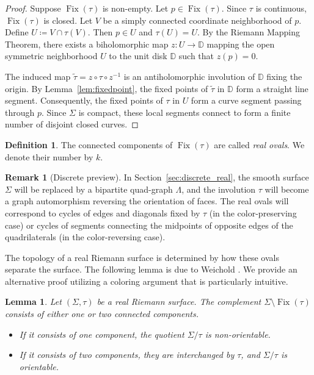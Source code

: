 \documentclass[11pt,a4paper]{article}
\newtheorem{lemma}[theorem]{Lemma}
\theoremstyle{definition}
\newtheorem*{definition}{Definition}
\newtheorem*{remark}{Remark}
\DeclareMathOperator{\fix}{\mathrm{Fix}}
\begin{document}
\begin{proof}
	Suppose $\fix(\tau)$ is non-empty. Let $p \in \fix(\tau)$. Since $\tau$ is continuous, $\fix(\tau)$ is closed. 
	Let $V$ be a simply connected coordinate neighborhood of $p$. Define $U \coloneq V \cap \tau(V)$. Then $p \in U$ and $\tau(U) = U$.
	By the Riemann Mapping Theorem, there exists a biholomorphic map $z: U \to \mathds{D}$ mapping the open symmetric neighborhood $U$ to the unit disk $\mathds{D}$ such that $z(p) = 0$.
	
	The induced map $\tilde{\tau} = z \circ \tau \circ z^{-1}$ is an antiholomorphic involution of $\mathds{D}$ fixing the origin. By Lemma~\ref{lem:fixedpoint}, the fixed points of $\tilde{\tau}$ in $\mathds{D}$ form a straight line segment. Consequently, the fixed points of $\tau$ in $U$ form a curve segment passing through $p$. Since $\Sigma$ is compact, these local segments connect to form a finite number of disjoint closed curves.
\end{proof}

\begin{definition}
	The connected components of $\fix(\tau)$ are called \emph{real ovals}. We denote their number by $k$.
\end{definition}

\begin{remark}[Discrete preview]
	In Section~\ref{sec:discrete_real}, the smooth surface $\Sigma$ will be replaced by a bipartite quad-graph $\Lambda$, and the involution $\tau$ will become a graph automorphism reversing the orientation of faces. The real ovals will correspond to cycles of edges and diagonals fixed by $\tau$ (in the color-preserving case) or cycles of segments connecting the midpoints of opposite edges of the quadrilaterals (in the color-reversing case).
\end{remark}

The topology of a real Riemann surface is determined by how these ovals separate the surface. The following lemma is due to Weichold \cite{Wei83}. We provide an alternative proof utilizing a coloring argument that is particularly intuitive.

\begin{lemma}\label{lem:12components}
	Let $(\Sigma, \tau)$ be a real Riemann surface. The complement $\Sigma \setminus \fix(\tau)$ consists of either one or two connected components.
	\begin{itemize}
		\item If it consists of one component, the quotient $\Sigma/\tau$ is non-orientable.
		\item If it consists of two components, they are interchanged by $\tau$, and $\Sigma/\tau$ is orientable.
	\end{itemize}
\end{lemma}
\end{document}
